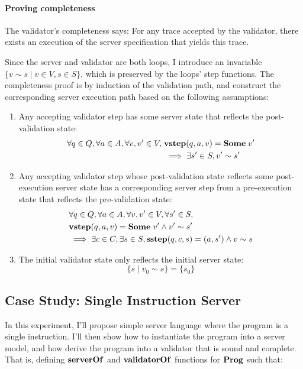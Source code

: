 \documentclass{article}
\theoremstyle{definition}
\newcommand{\sstep}{\ottkw{sstep}}
\newcommand{\vstep}{\ottkw{vstep}}
\newcommand{\Some}[1]{\ottkw{Some}\;#1}
\newcommand{\Prog}{\ottkw{Prog}}
\newcommand{\serverOf}{\ottkw{serverOf}}
\newcommand{\validatorOf}{\ottkw{validatorOf}}
\newcommand{\Reflects}[2]{#1\sim #2}
\begin{document}

\paragraph{Proving completeness}
The validator's completeness says: For any trace accepted by the validator,
there exists an execution of the server specification that yields this trace.

Since the server and validator are both loops, I introduce an invariable
$\{\Reflects{v}{s}\mid v\in V,s\in S\}$, which is preserved by the loops' step
functions.  The completeness proof is by induction of the validation path, and
construct the corresponding server execution path based on the following
assumptions:

\begin{enumerate}
\item Any accepting validator step has some server state that reflects the
  post-validation state:
  \begin{align*}
    \forall q\in Q,\forall a\in A,\forall v, v'\in V,\;&\vstep(q,a,v)=\Some{v'}\\
    &\implies\exists s'\in S,\Reflects{v'}{s'} 
  \end{align*}
\item Any accepting validator step whose post-validation state reflects some
  post-execution server state has a corresponding server step from a
  pre-execution state that reflects the pre-validation state:
  \begin{align*}
    &\forall q\in Q,\forall a\in A,\forall v,v'\in V,\forall s'\in S,\\
    &\vstep(q,a,v)=\Some{v'}\wedge\Reflects{v'}{s'}\\
    &\implies\exists c\in C,\exists s\in S,\sstep(q,c,s)=(a,s')\wedge\Reflects{v}{s}
  \end{align*}
\item The initial validator state only reflects the initial server state:
  \[\{s\mid\Reflects{v_0}{s}\}=\{s_0\}\]
\end{enumerate}


\subsection{Case Study: Single Instruction Server}
\label{sec:opserver}

In this experiment, I'll propose simple server language where the program is a
single instruction.  I'll then show how to instantiate the program into a server
model, and how derive the program into a validator that is sound and complete.
That is, defining $\serverOf$ and $\validatorOf$ functions for $\Prog$ such
that:
\end{document}
